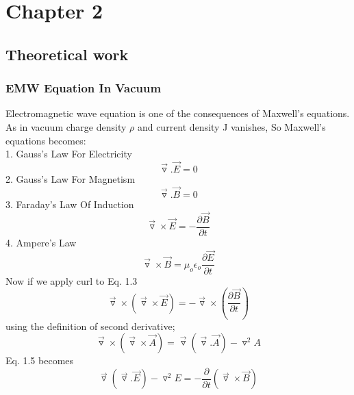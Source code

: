 \documentclass[a4paper, twoside] {thesis}
\begin{document}
\chapter{Chapter 2}
\section{Theoretical work}

\subsection{EMW Equation In Vacuum}
Electromagnetic wave equation is one of the consequences of Maxwell’s equations.\\
As in vacuum charge density $\rho$ and current density J vanishes, So Maxwell's equations becomes:\\
1. Gauss’s Law For Electricity\\
\begin{equation}
\vec{\triangledown}.\vec{E} = 0
\end{equation}
2. Gauss’s Law For Magnetism\\
\begin{equation}
\vec{\triangledown}.\vec{B} = 0
\end{equation}
3. Faraday’s Law Of Induction\\
\begin{equation}
\vec{\triangledown}\times\vec{E} = - \frac{\partial\vec{B}}{\partial t}
\end{equation}
4. Ampere’s Law\\
\begin{equation}
\vec{\triangledown}\times\vec{B} = \mu_{o}\epsilon_{o}\frac{\partial\vec{E}}{\partial t}
\end{equation}
Now if we apply curl to Eq. 1.3\\
\begin{equation}
\vec{\triangledown}\times(\vec{\triangledown}\times\vec{E}) = - \vec{\triangledown}\times(\frac{\partial\vec{B}}{\partial t})
\end{equation}
using the definition of second derivative;\\
\begin{equation}
\vec{\triangledown}\times(\vec{\triangledown}\times\vec{A}) = \vec{\triangledown}(\vec{\triangledown}.\vec{A})-{\triangledown}^2A
\end{equation}
Eq. 1.5 becomes\\
\begin{equation}
\vec{\triangledown}(\vec{\triangledown}.\vec{E})-{\triangledown}^2E = - \frac{\partial}{\partial t}(\vec{\triangledown}\times\vec{B})
\end{equation}
\end{document}
